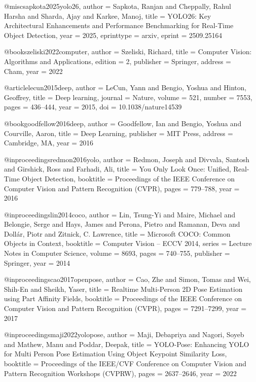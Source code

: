 @misc{sapkota2025yolo26,
  author       = {Sapkota, Ranjan and Cheppally, Rahul Harsha and Sharda, Ajay and Karkee, Manoj},
  title        = {{YOLO26}: Key Architectural Enhancements and Performance Benchmarking for Real-Time Object Detection},
  year         = {2025},
  eprinttype   = {arxiv},
  eprint       = {2509.25164}
}

@book{szeliski2022computer,
  author    = {Szeliski, Richard},
  title     = {Computer Vision: Algorithms and Applications},
  edition   = {2},
  publisher = {Springer},
  address   = {Cham},
  year      = {2022}
}

@article{lecun2015deep,
  author  = {LeCun, Yann and Bengio, Yoshua and Hinton, Geoffrey},
  title   = {Deep learning},
  journal = {Nature},
  volume  = {521},
  number  = {7553},
  pages   = {436--444},
  year    = {2015},
  doi     = {10.1038/nature14539}
}

@book{goodfellow2016deep,
  author    = {Goodfellow, Ian and Bengio, Yoshua and Courville, Aaron},
  title     = {Deep Learning},
  publisher = {MIT Press},
  address   = {Cambridge, MA},
  year      = {2016}
}

@inproceedings{redmon2016yolo,
  author    = {Redmon, Joseph and Divvala, Santosh and Girshick, Ross and Farhadi, Ali},
  title     = {You Only Look Once: Unified, Real-Time Object Detection},
  booktitle = {Proceedings of the IEEE Conference on Computer Vision and Pattern Recognition (CVPR)},
  pages     = {779--788},
  year      = {2016}
}

@inproceedings{lin2014coco,
  author    = {Lin, Tsung-Yi and Maire, Michael and Belongie, Serge and Hays, James and Perona, Pietro and Ramanan, Deva and Doll{\'a}r, Piotr and Zitnick, C. Lawrence},
  title     = {Microsoft {COCO}: Common Objects in Context},
  booktitle = {Computer Vision -- ECCV 2014},
  series    = {Lecture Notes in Computer Science},
  volume    = {8693},
  pages     = {740--755},
  publisher = {Springer},
  year      = {2014}
}

@inproceedings{cao2017openpose,
  author    = {Cao, Zhe and Simon, Tomas and Wei, Shih-En and Sheikh, Yaser},
  title     = {Realtime Multi-Person {2D} Pose Estimation using Part Affinity Fields},
  booktitle = {Proceedings of the IEEE Conference on Computer Vision and Pattern Recognition (CVPR)},
  pages     = {7291--7299},
  year      = {2017}
}

@inproceedings{maji2022yolopose,
  author    = {Maji, Debapriya and Nagori, Soyeb and Mathew, Manu and Poddar, Deepak},
  title     = {{YOLO-Pose}: Enhancing {YOLO} for Multi Person Pose Estimation Using Object Keypoint Similarity Loss},
  booktitle = {Proceedings of the IEEE/CVF Conference on Computer Vision and Pattern Recognition Workshops (CVPRW)},
  pages     = {2637--2646},
  year      = {2022}
}

